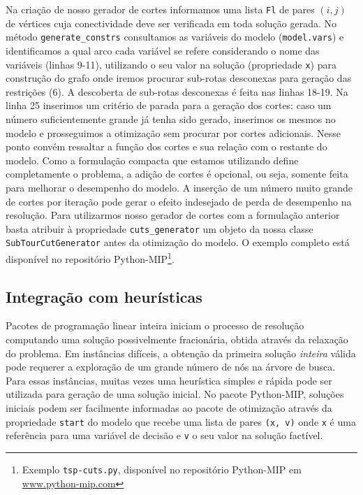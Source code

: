 \documentclass[a4paper,11pt,fleqn]{article}
\begin{document}
Na criação de nosso gerador de cortes informamos uma lista \texttt{Fl} de pares $(i,j)$ de vértices cuja conectividade deve ser verificada em toda solução gerada. 
No método \texttt{generate\_constrs} consultamos as variáveis do modelo (\texttt{model.vars}) e identificamos a qual arco cada variável se refere considerando o nome das variáveis (linhas 9-11), utilizando o seu valor na solução (propriedade \texttt{x}) para construção do grafo onde iremos procurar sub-rotas desconexas para geração das restrições (6). A descoberta de sub-rotas desconexas é feita nas linhas 18-19. Na linha 25 inserimos um critério de parada para a geração dos cortes: caso um número suficientemente grande já tenha sido gerado, inserimos os mesmos no modelo e prosseguimos a otimização sem procurar por cortes adicionais. Nesse ponto convém ressaltar a função dos cortes e sua relação com o restante do modelo. Como a formulação compacta que estamos utilizando define completamente o problema, a adição de cortes é opcional, ou seja, somente feita para melhorar o desempenho do modelo. A inserção de um número muito grande de cortes por iteração pode gerar o efeito indesejado de perda de desempenho na resolução. Para utilizarmos nosso gerador de cortes com a formulação anterior basta atribuir à propriedade \texttt{cuts\_generator} um objeto da nossa classe \texttt{SubTourCutGenerator} antes da otimização do modelo. O exemplo completo está disponível no repositório Python-MIP\footnote{Exemplo \texttt{tsp-cuts.py}, disponível no repositório Python-MIP em \url{www.python-mip.com}}.

\subsection{Integração com heurísticas}

Pacotes de programação linear inteira iniciam o processo de resolução computando uma solução possivelmente fracionária, obtida através da relaxação do problema. Em instâncias difíceis, a obtenção da primeira solução \emph{inteira} válida pode requerer a exploração de um grande número de nós na árvore de busca. Para essas instâncias, muitas vezes uma heurística simples e rápida pode ser utilizada para geração de uma solução inicial. No pacote Python-MIP, soluções iniciais podem ser facilmente informadas ao pacote de otimização através da propriedade \texttt{start} do modelo que recebe uma lista de pares \texttt{(x, v)} onde \texttt{x} é uma referência para uma variável de decisão e \texttt{v} o seu valor na solução factível. 
\end{document}
